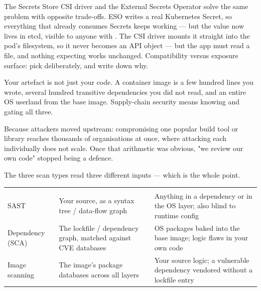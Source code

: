 \begin{tradeoff}
The Secrets Store CSI driver and the External Secrets Operator solve the same problem with opposite trade-offs. ESO writes a real Kubernetes Secret, so everything that already consumes Secrets keeps working --- but the value now lives in etcd, visible to anyone with . The CSI driver mounts it straight into the pod's filesystem, so it never becomes an API object --- but the app must read a file, and nothing expecting  works unchanged. Compatibility versus exposure surface: pick deliberately, and write down why.
\end{tradeoff}


 Your artefact is not just your code. A container image is a few hundred lines you wrote, several hundred transitive dependencies you did not read, and an entire OS userland from the base image. Supply-chain security means knowing and gating all three.

 Because attackers moved upstream: compromising one popular build tool or library reaches thousands of organisations at once, where attacking each individually does not scale. Once that arithmetic was obvious, "we review our own code" stopped being a defence.

 The three scan types read three different inputs --- which is the whole point.

\begin{center}\small
\wbrowcolors
\begin{tabularx}{\linewidth}{@{}L{25mm} L{30mm} X@{}}
 &  & \\
SAST & Your source, as a syntax tree / data-flow graph & Anything in a dependency or in the OS layer; also blind to runtime config\\
Dependency (SCA) & The lockfile / dependency graph, matched against CVE databases & OS packages baked into the base image; logic flaws in your own code\\
Image scanning & The image's package databases across all layers & Your source logic; a vulnerable dependency vendored without a lockfile entry\\
\end{tabularx}
\end{center}

